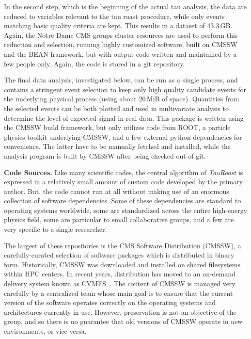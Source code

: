 \documentclass{acm_proc_article-sp}
\begin{document}
In the second step, which is the beginning of the actual tau analysis,
the data are reduced to variables relevant to the tau roast procedure, while
only events matching basic quality criteria are kept.  This results in
a dataset of 43.3$\,$GB.  Again, the Notre Dame CMS groups cluster
resources are used to perform this reduction and selection,
running highly customized software,
built on CMSSW and the BEAN framework,
but with output code written and maintained by a few people only.
Again, the code is stored in a git repository.

The final data analysis, investigated below, can be run as a single
process, and contains a stringent event selection to keep only high
quality candidate events for the underlying physical process (using
about 20$\,$MiB of space).  Quantities from the selected events can be
both plotted and used in multivariate analysis to determine the level
of expected signal in real data.
This package is written using the CMSSW build framework,
but only utilizes code from ROOT,
a particle physics toolkit underlying CMSSW,
and a few external python dependencies for convenience.
The latter have to be manually fetched and installed,
while the analysis program is built by CMSSW after being checked out of git.

{\bf Code Sources.} Like many scientific codes, the central algorithm
of \emph{TauRoast} is expressed in a relatively small amount of
custom code developed by the primary author.  But, the code cannot
run at all without making use of an enormous collection of software
dependencies.  Some of these dependencies are standard to operating
systems worldwide, some are standardized across the entire high-energy
physics field, some are particular to small collaborative groups,
and a few are very specific to a single researcher.

The largest of these repositories is the CMS Software Distribution (CMSSW),
a carefully-curated selection of software packages which is distributed
in binary form.  Historically, CMSSW was downloaded and installed on shared
filesystems within HPC centers.  In recent years, distribution has moved to
an on-demand delivery system known as CVMFS~\cite{blomer2011cernvm}.  The content
of CMSSW is managed very carefully by a centralized team whose main goal
is to ensure that the current version of the software operates correctly
on the operating systems and architectures currently in use.  However,
preservation is not an objective of the group, and so there is
no guarantee that old versions of CMSSW operate in new environments,
or vice versa. 
\end{document}
